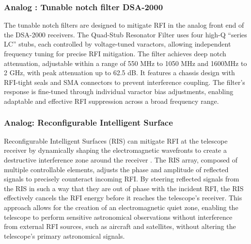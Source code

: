 \subsubsection{Analog : Tunable notch filter DSA-2000}

The tunable notch filters are designed to mitigate RFI in the analog front end of the DSA-2000 receivers. The Quad-Stub Resonator Filter uses four high-Q “series LC” stubs, each controlled by voltage-tuned varactors, allowing independent frequency tuning for precise RFI mitigation. The filter achieves deep notch attenuation, adjustable within a range of 550 MHz to 1050 MHz and 1600MHz to 2 GHz, with peak attenuation up to 62.5 dB. It features a chassis design with RFI-tight seals and SMA connectors to prevent interference coupling. The filter's response is fine-tuned through individual varactor bias adjustments, enabling adaptable and effective RFI suppression across a broad frequency range.

\subsubsection{Analog: Reconfigurable Intelligent Surface}

Reconfigurable Intelligent Surfaces (RIS) can mitigate RFI at the telescope receiver by dynamically shaping the electromagnetic wavefronts to create a destructive interference zone around the receiver \citep{zou2022scisrs,wei2024ris,wei2023multistage}. The RIS array, composed of multiple controllable elements, adjusts the phase and amplitude of reflected signals to precisely counteract incoming RFI. By steering reflected signals from the RIS in such a way that they are out of phase with the incident RFI, the RIS effectively cancels the RFI energy before it reaches the telescope’s receiver. This approach allows for the creation of an electromagnetic quiet zone, enabling the telescope to perform sensitive astronomical observations without interference from external RFI sources, such as aircraft and satellites, without altering the telescope’s primary astronomical signals.

